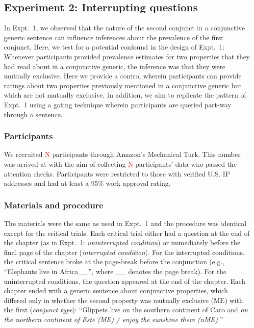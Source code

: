 \documentclass[10pt,letterpaper]{article}
\newcommand{\red}[1]{{\textcolor{Red}{#1}}}
\begin{document}
\subsection{Experiment 2: Interrupting questions}

In Expt.~1, we observed that the nature of the second conjunct in a conjunctive generic sentence can influence inferences about the prevalence of the first conjunct.
Here, we test for a potential confound in the design of Expt.~1: Whenever participants provided prevalence estimates for two properties that they had read about in a conjunctive generic, the inference was that they were mutually exclusive. 
Here we provide a control wherein participants can provide ratings about two properties previously mentioned in a conjunctive generic but which are not  mutually exclusive. 
In addition, we aim to replicate the pattern of Expt.~1 using a gating technique wherein participants are queried part-way through a sentence. 

\subsubsection{Participants}

We recruited \red{N} participants through Amazon's Mechanical Turk.
This number was arrived at with the aim of collecting \red{N} participants' data who passed the attention checks.  
Participants were restricted to those with verified U.S. IP addresses and had at least a 95\% work approval rating. 

\subsubsection{Materials and procedure}

The materials were the same as used in Expt.~1 and the procedure was identical except for the critical trials.
Each critical trial either had a question at the end of the chapter (as in Expt.~1; \emph{uninterrupted condition}) or immediately before the final page of the chapter (\emph{interrupted condition}).
For the interrupted conditions, the critical sentence broke at the page-break before the conjunction (e.g., ``Elephants live in Africa\_\_'', where \_\_ denotes the page break). 
For the uninterrupted conditions, the question appeared at the end of the chapter.
Each chapter ended with a generic sentence about conjunctive properties, which differed only in whether the second property was mutually exclusive (ME) with the first (\emph{conjunct type}): ``Glippets live on the southern continent of Caro and \emph{on the northern continent of Este (ME) /  enjoy the sunshine there (nME).}''
\end{document}
